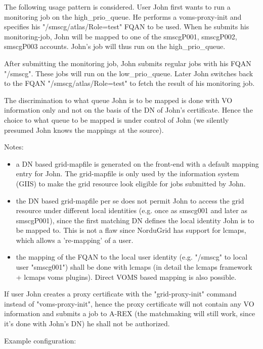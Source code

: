 \documentclass{article}
\begin{document}
The following usage pattern is considered. User John first wants to
run a monitoring job on the high\_prio\_queue. He performs a
voms-proxy-init and specifies his "/smscg/atlas/Role=test" FQAN to be
used. When he submits his monitoring-job, John will be mapped to one
of the smscgP001, smscgP002, smscgP003 accounts. John's job will thus
run on the high\_prio\_queue.

After submitting the monitoring job, John submits regular jobs with
his FQAN "/smscg". These jobs will run on the low\_prio\_queue. Later
John switches back to the FQAN "/smscg/atlas/Role=test" to fetch the
result of his monitoring job.

The discrimination to what queue John is to be mapped is done with VO
information only and not on the basis of the DN of John's
certificate. Hence the choice to what queue to be mapped is under
control of John (we silently presumed John knows the mappings at the
source).

Notes:
\begin{itemize}
\item a DN based grid-mapfile is generated on the front-end with a
  default mapping entry for John. The grid-mapfile is only used by the
  information system (GIIS) to make the grid resource look eligible
  for jobs submitted by John.
\item the DN based grid-mapfile per se does not permit John to access
  the grid resource under different local identities (e.g. once as
  smscg001 and later as smscgP001), since the first matching DN
  defines the local identity John is to be mapped to. This is not a
  flaw since NorduGrid has support for lcmaps, which allows a
  're-mapping' of a user.
\item the mapping of the FQAN to the local user identity
  (e.g. "/smscg" to local user "smscg001") shall be done with lcmaps
  (in detail the lcmaps framework + lcmaps voms plugins). Direct VOMS
  based mapping is also possible.
\end{itemize}

If user John creates a proxy certificate with the "grid-proxy-init"
command instead of "voms-proxy-init", hence the proxy certificate will
not contain any VO information and submits a job to A-REX (the
matchmaking will still work, since it's done with John's DN) he shall
not be authorized.

Example configuration:
\end{document}
